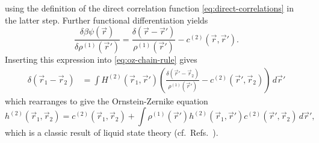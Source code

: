 using the definition of the direct correlation function \eqref{eq:direct-correlations} in the latter step.
Further functional differentiation yields
\begin{equation*}\label{eq:intrinsic-chemical-potential-inverse-derivative}
  \frac{\delta \beta \psi(\vec{r})}{\delta \rho^{(1)}(\vec{r}')}
  =
  \frac{\delta(\vec{r} - \vec{r}')}{\rho^{(1)}(\vec{r}')}
  - c^{(2)}(\vec{r}, \vec{r}').
\end{equation*}
Inserting this expression into \eqref{eq:oz-chain-rule} gives
\begin{equation*}
  \begin{split}
    \delta(\vec{r}_1 - \vec{r}_2)
    &=
    \int
    H^{(2)}(\vec{r}_1, \vec{r}')
    \left(
    \frac{\delta(\vec{r}' - \vec{r}_2)}{\rho^{(1)}(\vec{r}')} -
    c^{(2)}(\vec{r}', \vec{r}_2)
    \right)
    \, d\vec{r}'
  \end{split}
\end{equation*}
which rearranges to give the Ornstein-Zernike equation
\begin{equation}\label{eq:ornstein-zernike-generic}
  h^{(2)}(\vec{r}_1, \vec{r}_2) =
  c^{(2)}(\vec{r}_1, \vec{r}_2) +
  \int
  \rho^{(1)}(\vec{r}')
  h^{(2)}(\vec{r}_1, \vec{r}')
  c^{(2)}(\vec{r}', \vec{r}_2)
  \, d\vec{r}',
\end{equation}
which is a classic result of liquid state theory (cf.\ Refs.\ \cite{OrnsteinPAS1914,Hansen2013,EvansAP1979}).

